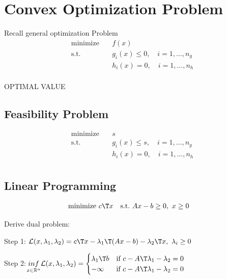 \section{Convex Optimization Problem}

Recall general optimization Problem
\begin{equation}
	\begin{aligned}
		\operatorname{minimize}\quad & f(x)                               \\
		\text{s.t.}                  & g_i(x) \le 0,\quad i = 1,\dots,n_g \\
		                             & h_i(x) = 0,\quad i = 1,\dots,n_h   \\
	\end{aligned}
	\label{eq:optimization}
\end{equation}

OPTIMAL VALUE

\subsection{Feasibility  Problem}

\begin{equation}
	\begin{aligned}
		\operatorname{minimize}\quad & s                                  \\
		\text{s.t.}                  & g_i(x) \le s,\quad i = 1,\dots,n_g \\
		                             & h_i(x) = 0,\quad i = 1,\dots,n_h   \\
	\end{aligned}
\end{equation}

\subsection{Linear Programming}

\begin{equation}
	\begin{aligned}
		\operatorname{minimize}\  & c\T x & \text{s.t.}\  & Ax-b \ge 0,\ x\ge0
	\end{aligned}
\end{equation}

Derive dual problem:

Step 1: $\mathcal{L}(x,\lambda_1,\lambda_2) = c\T x-\lambda_1\T (Ax-b) -\lambda_2\T x,\ \lambda_i \ge0$

Step 2:$\underset{x \in \mathcal{\mathbb{R}}^n}{inf}\mathcal{L}(x,\lambda_1,\lambda_2)
	= \begin{cases} \lambda_1\T b & \text{if }c-A\T\lambda_1-\lambda_2=0  \\
              -\infty       & \text{if } c-A\T\lambda_1-\lambda_2=0\end{cases}$

